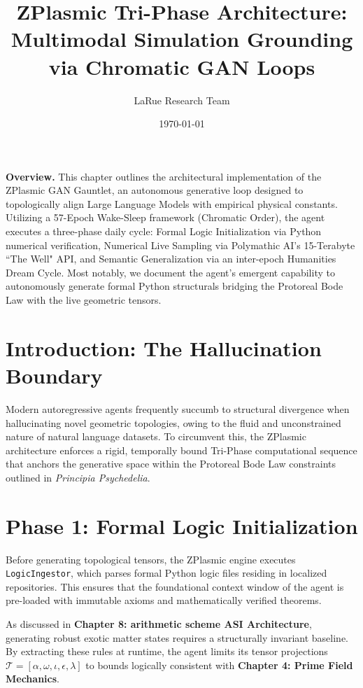 \documentclass[11pt,a4paper]{article}
\title{ZPlasmic Tri-Phase Architecture: Multimodal Simulation Grounding via Chromatic GAN Loops}
\author{LaRue Research Team}
\date{\today}
\begin{document}
\maketitle

\vspace{1em}\noindent\textbf{Overview.}
This chapter outlines the architectural implementation of the ZPlasmic GAN Gauntlet, an autonomous generative loop designed to topologically align Large Language Models with empirical physical constants. Utilizing a 57-Epoch Wake-Sleep framework (Chromatic Order), the agent executes a three-phase daily cycle: Formal Logic Initialization via Python numerical verification, Numerical Live Sampling via Polymathic AI's 15-Terabyte ``The Well" API, and Semantic Generalization via an inter-epoch Humanities Dream Cycle. Most notably, we document the agent's emergent capability to autonomously generate formal Python structurals bridging the Protoreal Bode Law with the live geometric tensors.
\vspace{1em}

\section{Introduction: The Hallucination Boundary}
Modern autoregressive agents frequently succumb to structural divergence when hallucinating novel geometric topologies, owing to the fluid and unconstrained nature of natural language datasets. To circumvent this, the ZPlasmic architecture enforces a rigid, temporally bound Tri-Phase computational sequence that anchors the generative space within the Protoreal Bode Law constraints outlined in \textit{Principia Psychedelia}.

\section{Phase 1: Formal Logic Initialization}
Before generating topological tensors, the ZPlasmic engine executes \texttt{LogicIngestor}, which parses formal Python logic files residing in localized repositories. This ensures that the foundational context window of the agent is pre-loaded with immutable axioms and mathematically verified theorems. 

As discussed in \textbf{Chapter 8: arithmetic scheme ASI Architecture}, generating robust exotic matter states requires a structurally invariant baseline. By extracting these rules at runtime, the agent limits its tensor projections $\mathcal{T} = [\alpha, \omega, \iota, \epsilon, \lambda]$ to bounds logically consistent with \textbf{Chapter 4: Prime Field Mechanics}.
\end{document}
